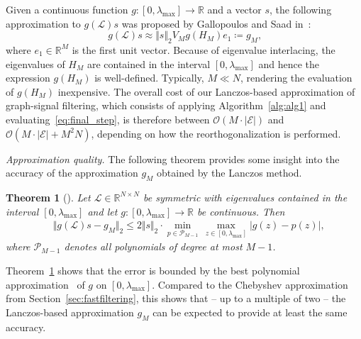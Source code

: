 \documentclass{article}
\newcommand{\E}{\mathcal{E}}
\newcommand{\Lap}{\mathcal{L}}
\newcommand{\Om}{\mathcal{O}}
\newcommand{\Rbb}{\mathbb{R}} \newcommand{\Cbb}{\mathbb{C}}
\newtheorem{theorem}{Theorem}
\begin{document}
Given a continuous function $g: [0,\lambda_{\max}] \to \mathbb R$ and a vector $s$, the following approximation
to $g(\Lap)s$ was proposed by Gallopoulos and Saad in~\cite{gallopoulos1992efficient}:
\begin{equation}
\label{eq:final_step}
g(\Lap)s \approx \Vert s \Vert_2 V_M g(H_M)e_1\coloneqq g_M\text{,}
\end{equation}
where $e_1 \in \Rbb^M$ is the first unit vector. Because of eigenvalue interlacing,
the eigenvalues of $H_M$ are contained in  the interval $[0,\lambda_{\max}]$ and
hence the expression $g(H_M)$ is well-defined. Typically, 
$M \ll N$, rendering the evaluation of $g(H_M)$ inexpensive. The overall cost of
our Lanczos-based approximation of graph-signal filtering, which consists of applying Algorithm~\ref{alg:alg1}
and evaluating~\eqref{eq:final_step}, is therefore between 
$\Om (M \cdot |\E|)$ and $\Om (M \cdot |\E| + M^2N)$, depending on how the reorthogonalization is performed.

\textit{Approximation quality.} The following theorem provides some insight into the accuracy of
the approximation $g_M$ obtained by the Lanczos method.
\begin{theorem}[{\cite[Corollary 3.4]{Guttel2013a}}]
\label{thm1}
Let $\Lap\in\mathbb{R}^{N\times N}$ be symmetric with eigenvalues contained in the interval $[ 0, \lambda_{\max}]$ and let $g:[ 0, \lambda_{\max}]\rightarrow \mathbb R$ be continuous.
Then 
\begin{align*}
&\Vert g(\Lap)s - g_M\Vert_2 
\leq 2\Vert s \Vert_2 \cdot  \underset{p\in \mathcal{P}_{M-1}}{\operatorname{min}}\, \underset{z \in \left[0, \lambda_{\max} \right]}{\operatorname{max}} \vert g(z) - p(z)\vert\text{,}
\end{align*}
where $\mathcal{P}_{M-1}$ denotes all polynomials of degree at most $M-1$.
\end{theorem}
Theorem~\ref{thm1} shows that the error is bounded by the best polynomial approximation~\cite{phillips2003interpolation} of $g$ on $[ 0, \lambda_{\max}]$.
Compared to the Chebyshev approximation from Section~\ref{sec:fastfiltering}, this shows that -- up to a multiple of two --
the Lanczos-based approximation $g_M$ can be expected to provide at least the same accuracy.
\end{document}
